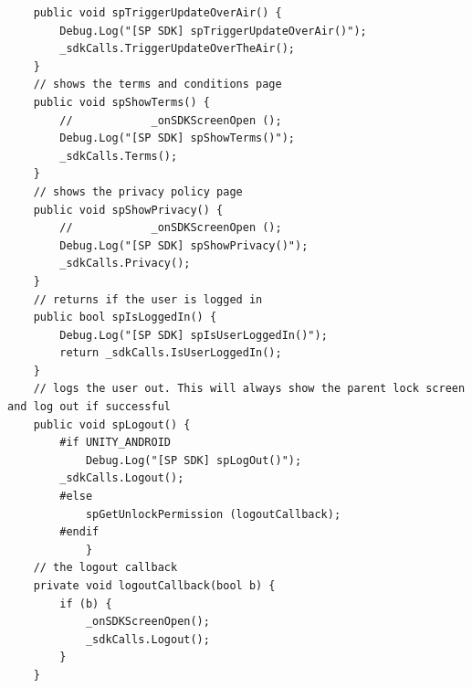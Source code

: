 \documentclass[9pt, b5paper]{article}
\begin{document}
\begin{verbatim}
    public void spTriggerUpdateOverAir() {
        Debug.Log("[SP SDK] spTriggerUpdateOverAir()");
        _sdkCalls.TriggerUpdateOverTheAir();
    }
    // shows the terms and conditions page
    public void spShowTerms() {
        //            _onSDKScreenOpen ();
        Debug.Log("[SP SDK] spShowTerms()");
        _sdkCalls.Terms();
    }
    // shows the privacy policy page
    public void spShowPrivacy() {
        //            _onSDKScreenOpen ();
        Debug.Log("[SP SDK] spShowPrivacy()");
        _sdkCalls.Privacy();
    }
    // returns if the user is logged in
    public bool spIsLoggedIn() {
        Debug.Log("[SP SDK] spIsUserLoggedIn()");
        return _sdkCalls.IsUserLoggedIn();
    }
    // logs the user out. This will always show the parent lock screen and log out if successful
    public void spLogout() {
        #if UNITY_ANDROID
            Debug.Log("[SP SDK] spLogOut()");
        _sdkCalls.Logout();
        #else
            spGetUnlockPermission (logoutCallback);
        #endif
            }
    // the logout callback
    private void logoutCallback(bool b) {
        if (b) {
            _onSDKScreenOpen();
            _sdkCalls.Logout();
        }
    }


\end{verbatim}
\end{document}

